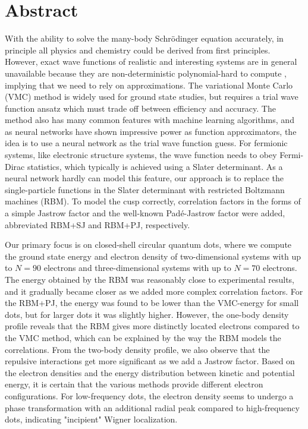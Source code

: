 \newpage
\section*{Abstract}
With the ability to solve the many-body Schrödinger equation accurately, in principle all physics and chemistry could be derived from first principles. However, exact wave functions of realistic and interesting systems are in general unavailable because they are non-deterministic polynomial-hard to compute \cite{troyer_computational_2005}, implying that we need to rely on approximations. The variational Monte Carlo (VMC) method is widely used for ground state studies, but requires a trial wave function ansatz which must trade off between efficiency and accuracy. The method also has many common features with machine learning algorithms, and as neural networks have shown impressive power as function approximators, the idea is to use a neural network as the trial wave function guess. For fermionic systems, like electronic structure systems, the wave function needs to obey Fermi-Dirac statistics, which typically is achieved using a Slater determinant. As a neural network hardly can model this feature, our approach is to replace the single-particle functions in the Slater determinant with restricted Boltzmann machines (RBM). To model the cusp correctly, correlation factors in the forms of a simple Jastrow factor and the well-known Padé-Jastrow factor were added, abbreviated RBM+SJ and RBM+PJ, respectively.

Our primary focus is on closed-shell circular quantum dots, where we compute the ground state energy and electron density of two-dimensional systems with up to $N=90$ electrons and three-dimensional systems with up to $N=70$ electrons. The energy obtained by the RBM was reasonably close to experimental results, and it gradually became closer as we added more complex correlation factors. For the RBM+PJ, the energy was found to be lower than the VMC-energy for small dots, but for larger dots it was slightly higher. However, the one-body density profile reveals that the RBM gives more distinctly located electrons compared to the VMC method, which can be explained by the way the RBM models the correlations. From the two-body density profile, we also observe that the repulsive interactions get more significant as we add a Jastrow factor. Based on the electron densities and the energy distribution between kinetic and potential energy, it is certain that the various methods provide different electron configurations. For low-frequency dots, the electron density seems to undergo a phase transformation with an additional radial peak compared to high-frequency dots, indicating "incipient" Wigner localization.

